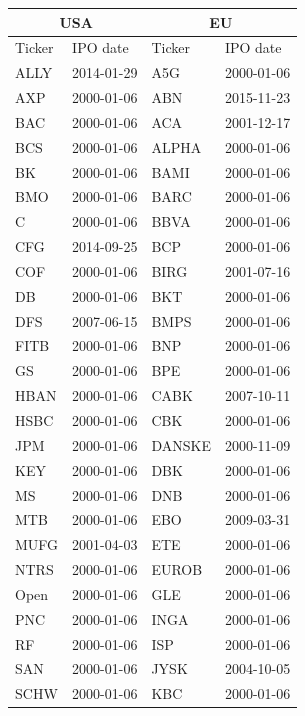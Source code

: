 \documentclass[12pt]{article}
\begin{document}
\begin{table}[!htbp]
	\centering
	\renewcommand{\arraystretch}{0.7}
	\begin{tabular}{l|l|l|l}\multicolumn{2}{c|}{USA} & \multicolumn{2}{c}{EU} \\
		\hline
		Ticker & IPO date & Ticker & IPO date \\ 
		\hline 
		ALLY & 2014-01-29 & A5G & 2000-01-06 \\ 
		AXP & 2000-01-06 & ABN & 2015-11-23 \\ 
		BAC & 2000-01-06 & ACA & 2001-12-17 \\ 
		BCS & 2000-01-06 & ALPHA & 2000-01-06 \\ 
		BK & 2000-01-06 & BAMI & 2000-01-06 \\ 
		BMO & 2000-01-06 & BARC & 2000-01-06 \\ 
		C & 2000-01-06 & BBVA & 2000-01-06 \\ 
		CFG & 2014-09-25 & BCP & 2000-01-06 \\ 
		COF & 2000-01-06 & BIRG & 2001-07-16 \\ 
		DB & 2000-01-06 & BKT & 2000-01-06 \\ 
		DFS & 2007-06-15 & BMPS & 2000-01-06 \\ 
		FITB & 2000-01-06 & BNP & 2000-01-06 \\ 
		GS & 2000-01-06 & BPE & 2000-01-06 \\ 
		HBAN & 2000-01-06 & CABK & 2007-10-11 \\ 
		HSBC & 2000-01-06 & CBK & 2000-01-06 \\ 
		JPM & 2000-01-06 & DANSKE & 2000-11-09 \\ 
		KEY & 2000-01-06 & DBK & 2000-01-06 \\ 
		MS & 2000-01-06 & DNB & 2000-01-06 \\ 
		MTB & 2000-01-06 & EBO & 2009-03-31 \\ 
		MUFG & 2001-04-03 & ETE & 2000-01-06 \\ 
		NTRS & 2000-01-06 & EUROB & 2000-01-06 \\ 
		Open & 2000-01-06 & GLE & 2000-01-06 \\ 
		PNC & 2000-01-06 & INGA & 2000-01-06 \\ 
		RF & 2000-01-06 & ISP & 2000-01-06 \\ 
		SAN & 2000-01-06 & JYSK & 2004-10-05 \\ 
		SCHW & 2000-01-06 & KBC & 2000-01-06 \\ 

\end{tabular}
\end{table}
\end{document}
